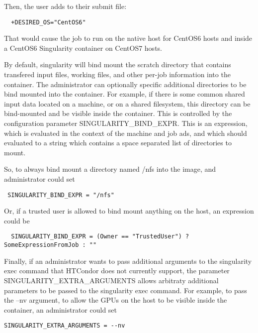 Then, the user adds to their submit file:

\begin{verbatim}
  +DESIRED_OS="CentOS6"
\end{verbatim}

That would cause the job to run on the native host for CentOS6 hosts
and inside a CentOS6 Singularity container on CentOS7 hosts.

By default, singularity will bind mount the scratch directory that contains transfered input files, 
working files, and other per-job information into the container.  The administrator can optionally
specific additional directories to be bind mounted into the container.  For example, if there is some common
shared input data located on a machine, or on a shared filesystem, this directory can be bind-mounted 
and be visible inside the container.  This is controlled by the configuration parameter
SINGULARITY\_BIND\_EXPR.  This is an expression, which is evaluated in the context of the machine and job ads,
and which should evaluated to a string which contains a space separated list of directories to mount.

So, to always bind mount a directory named /nfs into the image, and administrator could set
\begin{verbatim}
 SINGULARITY_BIND_EXPR = "/nfs"
\end{verbatim}

Or, if a trusted user is allowed to bind mount anything on the host, an expression could be
\begin{verbatim}
  SINGULARITY_BIND_EXPR = (Owner == "TrustedUser") ? SomeExpressionFromJob : ""
\end{verbatim}

Finally, if an administrator wants to pass additional arguments to the singularity exec command that HTCondor
does not currently support, the parameter SINGULARITY\_EXTRA\_ARGUMENTS allows arbitraty additional parameters
to be passed to the singularity exec command.  For example, to pass the --nv argument, to allow the GPUs on the
host to be visible inside the container, an administrator could set

\begin{verbatim}
SINGULARITY_EXTRA_ARGUMENTS = --nv
\end{verbatim}

